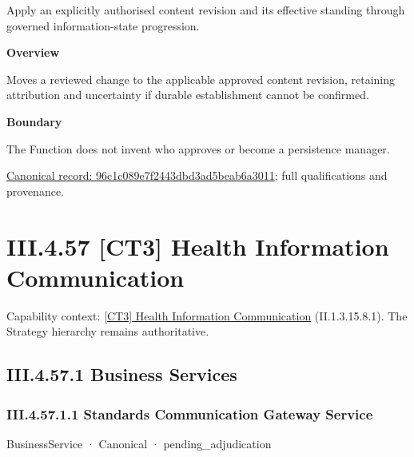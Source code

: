 Apply an explicitly authorised content revision and its effective standing through governed information-state progression.



\textbf{Overview}



Moves a reviewed change to the applicable approved content revision, retaining attribution and uncertainty if durable establishment cannot be confirmed.



\textbf{Boundary}



The Function does not invent who approves or become a persistence manager.


{\footnotesize \href{../../../../continuum/business/business-function/96c1c089e7f2443dbd3ad5beab6a3011.md}{Canonical record: 96c1c089e7f2443dbd3ad5beab6a3011}; full qualifications and provenance.}\par
\section*{III.4.57 [CT3] Health Information Communication}
\label{navigation:III.4.57}

{\small Capability context: \hyperref[element:9794b2aff43443b495a19aefe0efa67b]{[CT3] Health Information Communication} (II.1.3.15.8.1). The Strategy hierarchy remains authoritative.}\par
\subsection*{III.4.57.1 Business Services}
\label{navigation:III.4.57.1}

\subsubsection*{III.4.57.1.1 Standards Communication Gateway Service}
\label{navigation:III.4.57.1.1}

\label{element:80e239faf1bd476e973eb602b3730380}
{\small BusinessService · Canonical · pending\_adjudication}\par

